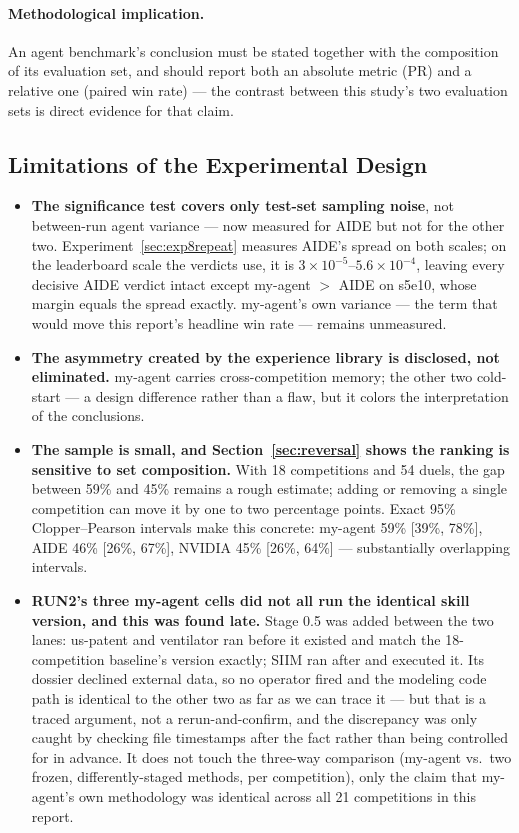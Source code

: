 \documentclass[11pt,a4paper]{article}
\begin{document}
\paragraph{Methodological implication.} An agent benchmark's conclusion must be stated together with the composition of its evaluation set, and should report both an absolute metric (PR) and a relative one (paired win rate) --- the contrast between this study's two evaluation sets is direct evidence for that claim.

\subsection{Limitations of the Experimental Design}
\label{sec:limitations}

\begin{itemize}[leftmargin=*]
  \item \textbf{The significance test covers only test-set sampling noise}, not between-run agent variance --- now measured for AIDE but not for the other two. Experiment~\ref{sec:exp8repeat} measures AIDE's spread on both scales; on the leaderboard scale the verdicts use, it is $3\times10^{-5}$--$5.6\times10^{-4}$, leaving every decisive AIDE verdict intact except my-agent $>$ AIDE on s5e10, whose margin equals the spread exactly. my-agent's own variance --- the term that would move this report's headline win rate --- remains unmeasured.
  \item \textbf{The asymmetry created by the experience library is disclosed, not eliminated.} my-agent carries cross-competition memory; the other two cold-start --- a design difference rather than a flaw, but it colors the interpretation of the conclusions.
  \item \textbf{The sample is small, and Section~\ref{sec:reversal} shows the ranking is sensitive to set composition.} With 18 competitions and 54 duels, the gap between 59\% and 45\% remains a rough estimate; adding or removing a single competition can move it by one to two percentage points. Exact 95\% Clopper--Pearson intervals make this concrete: my-agent 59\% [39\%, 78\%], AIDE 46\% [26\%, 67\%], NVIDIA 45\% [26\%, 64\%] --- substantially overlapping intervals.
  \item \textbf{RUN2's three my-agent cells did not all run the identical skill version, and this was found late.} Stage 0.5 was added between the two lanes: us-patent and ventilator ran before it existed and match the 18-competition baseline's version exactly; SIIM ran after and executed it. Its dossier declined external data, so no operator fired and the modeling code path is identical to the other two as far as we can trace it --- but that is a traced argument, not a rerun-and-confirm, and the discrepancy was only caught by checking file timestamps after the fact rather than being controlled for in advance. It does not touch the three-way comparison (my-agent vs.\ two frozen, differently-staged methods, per competition), only the claim that my-agent's own methodology was identical across all 21 competitions in this report.
\end{itemize}
\end{document}
